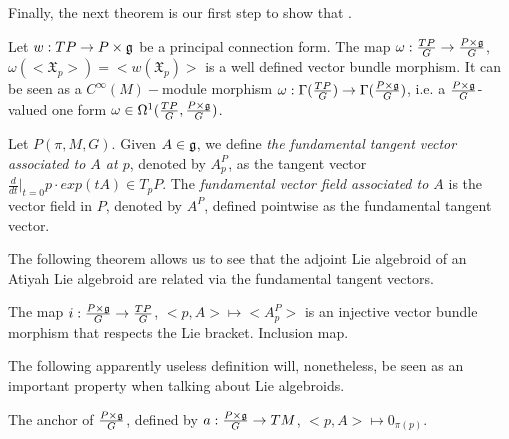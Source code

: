 Finally, the next theorem is our first step to show that .

\begin{theorem}
Let $w:TP \to P \times \mathfrak{g}$ be a principal connection form. The map $\omega: \frac{TP}{G} \to \frac{P \times \mathfrak{g}}{G}$, $\omega(<\mathfrak{X}_p>) = <w(\mathfrak{X}_p)>$ is a well defined vector bundle morphism. It can be seen as a $C^\infty(M)-$module morphism $\omega: \Gamma(\frac{TP}{G}) \to \Gamma(\frac{P \times \mathfrak{g}}{G})$, i.e. a $\frac{P \times \mathfrak{g}}{G}$-valued one form $\omega \in \Omega^1(\frac{TP}{G}, \frac{P \times \mathfrak{g}}{G})$.
\end{theorem}


\begin{definition}
Let $P(\pi, M, G)$. Given $A \in \mathfrak{g}$, we define \emph{the fundamental tangent vector associated to $A$ at $p$}, denoted by $A_p^P$, as the tangent vector $ \frac{d}{dt}|_{t = 0} p \cdot exp(tA) \in T_pP$. The \emph{fundamental vector field associated to $A$} is the vector field in $P$, denoted by $A^P$, defined pointwise as the fundamental tangent vector.
\end{definition}

The following theorem allows us to see that the adjoint Lie algebroid of an Atiyah Lie algebroid are related via the fundamental tangent vectors.

\begin{lemma}
The map $i:\frac{P \times \mathfrak{g}}{G} \to \frac{TP}{G}$, $<p, A> \mapsto <A_p^P>$ is an injective vector bundle morphism that respects the Lie bracket. Inclusion  map.
\end{lemma}

The following apparently useless definition will, nonetheless, be seen as an important property when talking about Lie algebroids.

\begin{definition}
The anchor of $\frac{P \times \mathfrak{g}}{G}$, defined by $a:\frac{P \times \mathfrak{g}}{G} \to TM$, $<p, A> \mapsto 0_{\pi(p)}$.
\end{definition}

